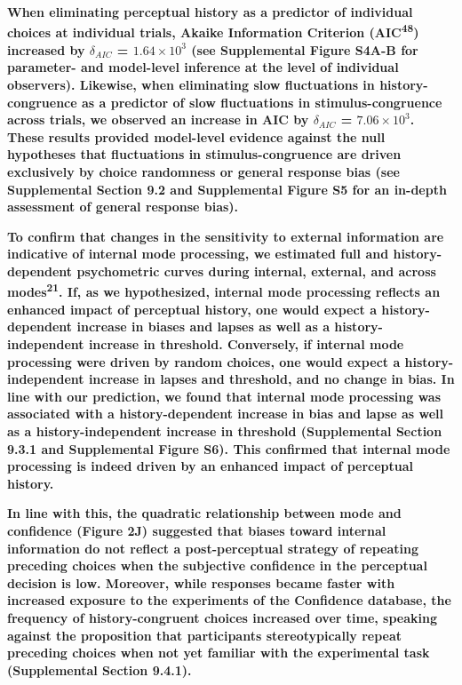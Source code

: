 \documentclass[
]{article}
\begin{document}
\textbf{When eliminating perceptual history as a predictor of individual
choices at individual trials, Akaike Information Criterion
(AIC\textsuperscript{48}) increased by \(\delta_{AIC}\) =
\(\ensuremath{1.64\times 10^{3}}\) (see Supplemental Figure S4A-B for
parameter- and model-level inference at the level of individual
observers). Likewise, when eliminating slow fluctuations in
history-congruence as a predictor of slow fluctuations in
stimulus-congruence across trials, we observed an increase in AIC by
\(\delta_{AIC}\) = \(\ensuremath{7.06\times 10^{3}}\). These results
provided model-level evidence against the null hypotheses that
fluctuations in stimulus-congruence are driven exclusively by choice
randomness or general response bias (see Supplemental Section 9.2 and
Supplemental Figure S5 for an in-depth assessment of general response
bias).}

\textbf{To confirm that changes in the sensitivity to external
information are indicative of internal mode processing, we estimated
full and history-dependent psychometric curves during internal,
external, and across modes\textsuperscript{21}. If, as we hypothesized,
internal mode processing reflects an enhanced impact of perceptual
history, one would expect a history-dependent increase in biases and
lapses as well as a history-independent increase in threshold.
Conversely, if internal mode processing were driven by random choices,
one would expect a history-independent increase in lapses and threshold,
and no change in bias. In line with our prediction, we found that
internal mode processing was associated with a history-dependent
increase in bias and lapse as well as a history-independent increase in
threshold (Supplemental Section 9.3.1 and Supplemental Figure S6). This
confirmed that internal mode processing is indeed driven by an enhanced
impact of perceptual history.}

\textbf{In line with this, the quadratic relationship between mode and
confidence (Figure 2J) suggested that biases toward internal information
do not reflect a post-perceptual strategy of repeating preceding choices
when the subjective confidence in the perceptual decision is low.
Moreover, while responses became faster with increased exposure to the
experiments of the Confidence database, the frequency of
history-congruent choices increased over time, speaking against the
proposition that participants stereotypically repeat preceding choices
when not yet familiar with the experimental task (Supplemental Section
9.4.1).}
\end{document}

